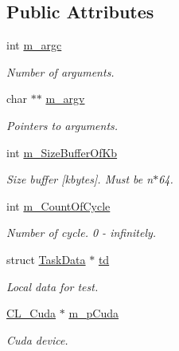 \subsection*{Public Attributes}
\begin{DoxyCompactItemize}
\item 
int \hyperlink{classTF__TestCnt_ae5c1457ee61a41a35a721fcd064892cb}{m\_\-argc}
\begin{DoxyCompactList}\small\item\em Number of arguments. \item\end{DoxyCompactList}\item 
char $\ast$$\ast$ \hyperlink{classTF__TestCnt_a488e38fc6a844dbbf7ec8304717524ef}{m\_\-argv}
\begin{DoxyCompactList}\small\item\em Pointers to arguments. \item\end{DoxyCompactList}\item 
int \hyperlink{classTF__TestCnt_acbae8197757e11371fde750b576e06cc}{m\_\-SizeBufferOfKb}
\begin{DoxyCompactList}\small\item\em Size buffer \mbox{[}kbytes\mbox{]}. Must be n$\ast$64. \item\end{DoxyCompactList}\item 
int \hyperlink{classTF__TestCnt_a70e774fb6d9ae7612e09435db2c181bf}{m\_\-CountOfCycle}
\begin{DoxyCompactList}\small\item\em Number of cycle. 0 -\/ infinitely. \item\end{DoxyCompactList}\item 
struct \hyperlink{structTaskData}{TaskData} $\ast$ \hyperlink{classTF__TestCnt_ad07a631fa0915ea387e2877bf06ef7b2}{td}
\begin{DoxyCompactList}\small\item\em Local data for test. \item\end{DoxyCompactList}\item 
\hyperlink{classCL__Cuda}{CL\_\-Cuda} $\ast$ \hyperlink{classTF__TestCnt_ae3ae3864214526738718e0c7c81e915f}{m\_\-pCuda}
\begin{DoxyCompactList}\small\item\em Cuda device. \item\end{DoxyCompactList}\end{DoxyCompactItemize}


